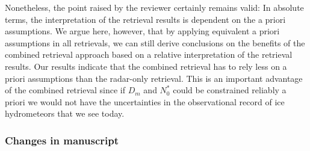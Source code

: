 Nonetheless, the point raised by the reviewer certainly remains valid: In
absolute terms, the interpretation of the retrieval results is dependent on the
a priori assumptions. We argue here, however, that by applying equivalent a
priori assumptions in all retrievals, we can still derive conclusions on the
benefits of the combined retrieval approach based on a relative interpretation
of the retrieval results. Our results indicate that the combined retrieval has
to rely less on a priori assumptions than the radar-only retrieval. This is
an important advantage of the combined retrieval since if $D_m$ and $N_0^*$
could be constrained reliably a priori we would not have the uncertainties in
the observational record of ice hydrometeors that we see today.

\subsubsection*{Changes in manuscript}

